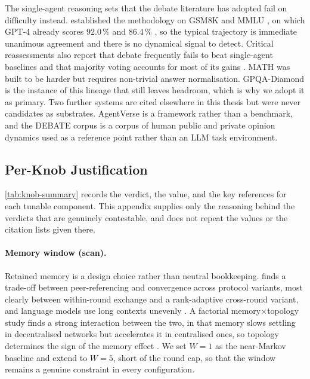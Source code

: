 The single-agent reasoning sets that the debate literature has adopted fail on
difficulty instead. \citet{du2024improving} established the methodology on GSM8K
\citep{cobbe2021gsm8k} and MMLU \citep{hendrycks2021mmlu}, on which GPT-4
already scores $92.0\,\%$ and $86.4\,\%$ \citep{achiam2023gpt4}, so the typical
trajectory is immediate unanimous agreement and there is no dynamical signal to
detect. Critical reassessments also report that debate frequently fails to beat
single-agent baselines \citep{liu2025stopovervaluing} and that majority voting
accounts for most of its gains \citep{zhang2025debateorvote}. MATH \citep{hendrycks2021math} was built to be harder but
requires non-trivial answer normalisation. GPQA-Diamond \citep{rein2024gpqa} is the instance of this lineage that
still leaves headroom, which is why we adopt it as primary. Two further systems
are cited elsewhere in this thesis but were never candidates as substrates.
AgentVerse \citep{chen2024agentverse} is a framework rather than a benchmark, and
the DEBATE corpus \citep{chuang2025debate} is a corpus of human public and private
opinion dynamics used as a reference point rather than an \ac{LLM} task environment.

\subsection{Per-Knob Justification}
\label{app:knobs}

\autoref{tab:knob-summary} records the verdict, the value, and the key references
for each tunable component. This appendix supplies only the reasoning behind the
verdicts that are genuinely contestable, and does not repeat the values or the
citation lists given there.

\paragraph{Memory window (scan).}
Retained memory is a design choice rather than neutral bookkeeping.
\citet{marandi2026protocols} finds a trade-off between peer-referencing and convergence across protocol variants, most clearly between within-round exchange and a rank-adaptive cross-round variant,
and language models use long contexts unevenly \citep{liu2024lostmiddle}. A
factorial memory$\times$topology study finds a strong interaction between the two, in that
memory slows settling in decentralised networks but accelerates it in centralised
ones, so topology determines the sign of the memory effect
\citep{mehdizadeh2026topologymemory}. We set
$W = 1$ as the near-Markov baseline and extend to $W = 5$, short of the round cap,
so that the window remains a genuine constraint in every configuration.

